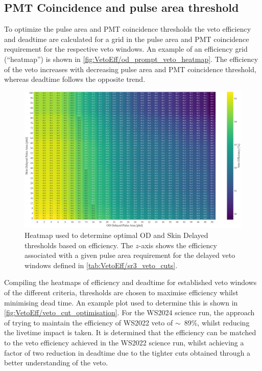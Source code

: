 \subsection{PMT Coincidence and pulse area threshold}
To optimize the pulse area and PMT coincidence thresholds the veto efficiency and deadtime are calculated for a grid in the pulse area and PMT coincidence requirement for the respective veto windows. An example of an efficiency grid (``heatmap'') is shown in \autoref{fig:VetoEff/od_prompt_veto_heatmap}. The efficiency of the veto increases with decreasing pulse area and PMT coincidence threshold, whereas deadtime follows the opposite trend.

\begin{figure}
	\centering
	\includegraphics[width=\textwidth]{figures/VetoEfficiency/Heatmap600us_ODDelayedSkinDelayedThresholds.png}
	\caption[Heatmap used to determine optimal OD and Skin Delayed thresholds based on efficiency.]{Heatmap used to determine optimal OD and Skin Delayed thresholds based on efficiency. The $z$-axis shows the efficiency associated with a given pulse area requirement for the delayed veto windows defined in \autoref{tab:VetoEff/sr3_veto_cuts}.}
	\label{fig:VetoEff/od_prompt_veto_heatmap}
\end{figure}

Compiling the heatmaps of efficiency and deadtime for established veto windows of the different criteria, thresholds are chosen to maximise efficiency whilst minimising dead time. An example plot used to determine this is shown in \autoref{fig:VetoEff/veto_cut_optimisation}.
For the WS2024 science run, the approach of trying to maintain the efficiency of WS2022 veto of $\sim$~89\%, whilst reducing the livetime impact is taken. It is determined that the efficiency can be matched to the veto efficiency achieved in the WS2022 science run, whilst achieving a factor of two reduction in deadtime due to the tighter cuts obtained through a better understanding of the veto.

